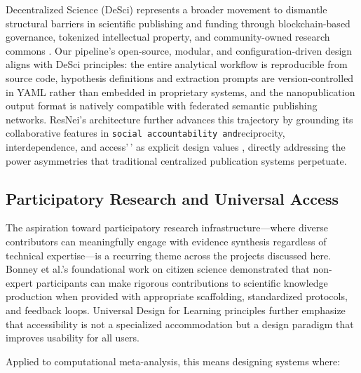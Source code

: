 \documentclass[
  english,
]{article}
\begin{document}
Decentralized Science (DeSci) represents a broader movement to dismantle
structural barriers in scientific publishing and funding through
blockchain-based governance, tokenized intellectual property, and
community-owned research commons \citep{hamburg2021desci}. Our
pipeline's open-source, modular, and configuration-driven design aligns
with DeSci principles: the entire analytical workflow is reproducible
from source code, hypothesis definitions and extraction prompts are
version-controlled in YAML rather than embedded in proprietary systems,
and the nanopublication output format is natively compatible with
federated semantic publishing networks. ResNei's architecture further
advances this trajectory by grounding its collaborative features in
\texttt{social\ accountability\textquotesingle{}\textquotesingle{}\ and}reciprocity,
interdependence, and access'\,' as explicit design values
\citep{lumiruusu2025resnei}, directly addressing the power asymmetries
that traditional centralized publication systems perpetuate.

\subsection{Participatory Research and Universal
Access}\label{participatory-research-and-universal-access}

The aspiration toward participatory research infrastructure---where
diverse contributors can meaningfully engage with evidence synthesis
regardless of technical expertise---is a recurring theme across the
projects discussed here. Bonney et al.'s foundational work on citizen
science \citep{bonney2009citizen} demonstrated that non-expert
participants can make rigorous contributions to scientific knowledge
production when provided with appropriate scaffolding, standardized
protocols, and feedback loops. Universal Design for Learning principles
\citep{rose2000universal} further emphasize that accessibility is not a
specialized accommodation but a design paradigm that improves usability
for all users.

Applied to computational meta-analysis, this means designing systems
where:
\end{document}
